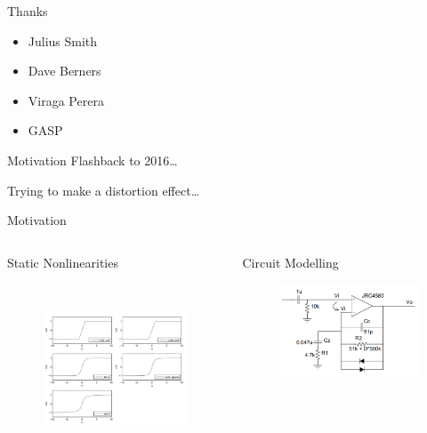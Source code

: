\begin{frame}{Thanks}
    \begin{itemize}
        \setlength\itemsep{1em}
        \item Julius Smith
        \item Dave Berners
        \item Viraga Perera
        \item GASP
    \end{itemize}
\end{frame}

\begin{frame}{Motivation}
    Flashback to 2016\dots

    \vspace{6ex}

    \begin{center}
        Trying to make a distortion effect\dots
    \end{center}
\end{frame}

\begin{frame}{Motivation}
    \begin{columns}
        \begin{column}{0.5\linewidth}
            Static Nonlinearities
            \begin{figure}
                \includegraphics[height=2in]{Figures/yeh_NLs}
            \end{figure}
        \end{column}
        \begin{column}{0.5\linewidth}
            Circuit Modelling
            \begin{figure}
                \includegraphics[width=2.5in]{Figures/yeh_pedal}
            \end{figure}
        \end{column}
    \end{columns}
\end{frame}

